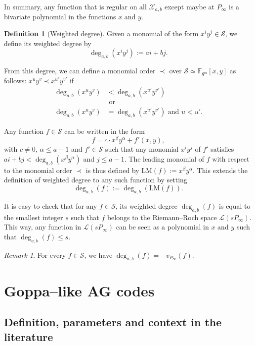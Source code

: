 \documentclass[lettersize,journal]{IEEEtran}
\theoremstyle{plain}
\theoremstyle{definition}
\newtheorem{definition}[thm]{Definition}
\theoremstyle{remark}
\newtheorem{remark}[thm]{Remark}
\newcommand{\calL}{\mathcal{L}}
\newcommand{\calS}{\mathcal{S}}
\newcommand{\calX}{\mathcal{X}}
\newcommand{\fqm}{\mathbb{F}_{q^m}}
\newcommand{\degab}[1]{\deg_{a,b}\left(#1\right)}
\begin{document}
	In summary, any function that is regular on all $\calX_{a,b}$ except maybe at $P_\infty$ is a bivariate polynomial in the functions $x$ and $y$. 
	
	\begin{definition}[Weighted degree] 
		Given a monomial of the form $x^iy^j \in \calS$, we define its weighted degree by
		\[ \degab{x^iy^j} := ai+bj.\]
		
		From this degree, we can define a monomial order $\prec$ over $\calS \simeq \fqm[x,y]$ as follows: $x^uy^v \prec x^{u'}y^{v'}$ if
		\begin{equation}\label{eq:def_mon_order}
			\begin{aligned}			
			\degab{x^uy^v} &< \degab{x^{u'}y^{v'}} \\
			&\text{ or }\\
			 \degab{x^uy^v} &= \degab{x^{u'}y^{v'}}  \text{ and } u < u'.
			 \end{aligned}
		\end{equation}
		
		Any function $f \in \calS$ can be written in the form $$f = c \cdot x^{\beta}y^{\alpha} + f'(x,y),$$
		with $c \neq 0$, $\alpha \leq a-1$ and $f' \in \calS$ such that any monomial $x^iy^j$ of $f'$ satisfies $ai+bj < \degab{x^{\beta}y^{\alpha}}$ and $j \leq a-1$. The leading monomial of $f$ with respect to the monomial order $\prec$ is thus defined by $\mathrm{LM}(f) := x^{\beta}y^{\alpha}$. This extends the definition of weighted degree to any such function by setting 
		\[\degab{f} := \degab{\mathrm{LM}(f)}.\]
	\end{definition}
	
	It is easy to check that for any $f \in \calS$, its weighted degree $\degab{f}$ is equal to the smallest integer $s$ such that $f$ belongs to the Riemann--Roch space $\calL(sP_{\infty})$.
	This way, any function in $\calL(sP_\infty)$ can be seen as a polynomial in $x$ and $y$ such that $\degab{f}\leq s$. 
	\begin{remark} \label{rq:link_degab_valuation}
		For every $f \in \calS$, we have $\degab{f}=-v_{P_\infty}(f)$.
	\end{remark}
	
	\section{Goppa--like AG codes}\label{sec:Goppa}
	\subsection{Definition, parameters and context in the literature}\label{subsec:def-Goppa}
	
\end{document}
